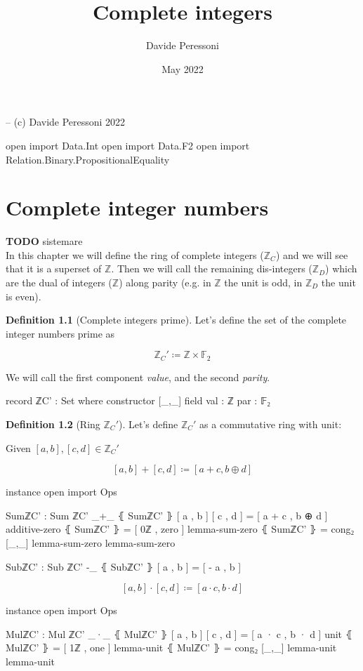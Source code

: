 \documentclass[a4paper]{report}
\title{Complete integers}
\author{Davide Peressoni}
\date{May 2022}
\theoremstyle{definition}
\newtheorem{definition}{Definition}
\newcommand\bZ{\mathbb{Z}}
\newcommand\bF{\mathbb{F}}
\begin{document}
\maketitle

\begin{code}
-- (c) Davide Peressoni 2022

open import Data.Int
open import Data.F2
open import Relation.Binary.PropositionalEquality
\end{code}

\chapter{Complete integer numbers}

\textbf{TODO} sistemare\\
In this chapter we will define the ring of complete integers ($\bZ_C$) and we will
see that it is a superset of $\bZ$. Then we will call the remaining dis-integers
($\bZ_D$) which are the dual of integers ($\bZ$) along parity (e.g. in $\bZ$ the unit is
odd, in $\bZ_D$ the unit is even).

\begin{definition}[Complete integers prime]
Let's define the set of the complete integer numbers prime as

\[\bZ_C' \coloneqq \bZ\times\bF_2\]

We will call the first component \emph{value}, and the second \emph{parity}.

\begin{code}
record ℤC' : Set where
  constructor [_,_]
  field
    val : ℤ
    par : 𝔽₂
\end{code}
\end{definition}

\begin{definition}[Ring $\bZ_C'$]
Let's define $\bZ_C'$ as a commutative ring with unit:

Given $[a,b], [c,d] \in \bZ_C'$

\[[a,b] + [c,d] \coloneqq [a+c, b\oplus d]\]

\begin{code}
instance
  open import Ops

  SumℤC' : Sum ℤC'
  _+_ ⦃ SumℤC' ⦄ [ a , b ] [ c , d ] = [ a + c , b ⊕ d ]
  additive-zero ⦃ SumℤC' ⦄ = [ 0ℤ , zero ]
  lemma-sum-zero ⦃ SumℤC' ⦄ = cong₂ [_,_] lemma-sum-zero lemma-sum-zero

  SubℤC' : Sub ℤC'
  -_ ⦃ SubℤC' ⦄ [ a , b ] = [ - a , b ]
\end{code}

\[[a,b] \cdot [c,d] \coloneqq [a\cdot c, b\cdot d]\]

\begin{code}
instance
  open import Ops

  MulℤC' : Mul ℤC'
  _·_ ⦃ MulℤC' ⦄ [ a , b ] [ c , d ] = [ a · c , b · d ]
  unit ⦃ MulℤC' ⦄ = [ 1ℤ , one ]
  lemma-unit ⦃ MulℤC' ⦄ = cong₂ [_,_] lemma-unit lemma-unit
\end{code}
\end{definition}
\end{document}
